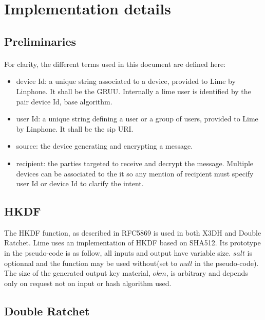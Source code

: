 \documentclass[a4paper,11pt]{article}
\begin{document}
\newpage
\section{Implementation details}
  \subsection{Preliminaries}
    \paragraph{}For clarity, the different terms used in this document are defined here:
    \begin{itemize}
      \item device Id: a unique string associated to a device, provided to Lime by Linphone. It shall be the GRUU\cite{rfc5627}. Internally a lime user is identified by the pair device Id, base algorithm.
      \item user Id: a unique string defining a user or a group of users, provided to Lime by Linphone. It shall be the sip URI.
      \item source: the device generating and encrypting a message.
      \item recipient: the parties targeted to receive and decrypt the message. Multiple devices can be associated to the it so any mention of recipient must specify user Id or device Id to clarify the intent.
    \end{itemize}

  \subsection{HKDF}
      The HKDF function, as described in RFC5869 \cite{rfc5869} is used in both X3DH and Double Ratchet. Lime uses an implementation of HKDF based on SHA512. Its prototype in the pseudo-code is as follow, all inputs and output have variable size. $salt$ is optionnal and the function may be used without(set to $null$ in the pseudo-code). The size of the generated output key material, $okm$, is arbitrary and depends only on request not on input or hash algorithm used.
      \begin{algorithmic}
        \Statex
          \State {}
        \EndFunction
      \end{algorithmic}
  \subsection{Double Ratchet}
\end{document}
